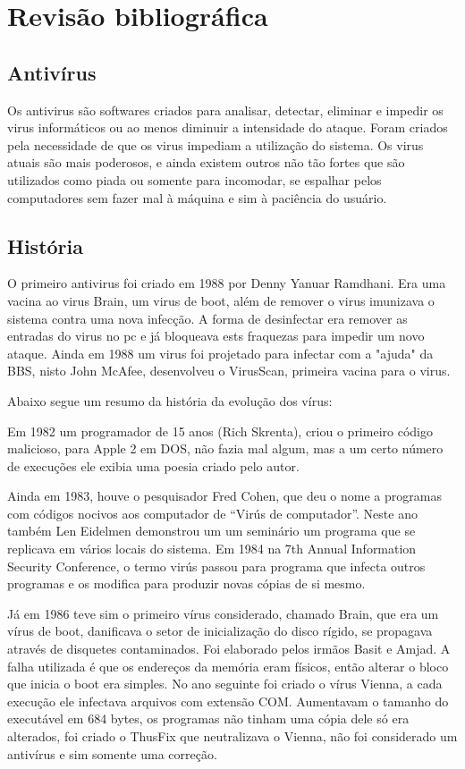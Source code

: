 
\chapter{Revisão bibliográfica}

\section{Antivírus}
Os antivirus \cite{Szor} são softwares criados para analisar, detectar, eliminar e impedir os virus informáticos ou ao menos diminuir a intensidade do ataque. Foram criados pela necessidade de que os virus impediam a utilização do sistema. Os virus atuais são mais poderosos, e ainda existem outros não tão fortes que são utilizados como piada ou somente para incomodar, se espalhar pelos computadores sem fazer mal à máquina e sim à paciência do usuário.

\section{História}
O primeiro antivirus foi criado em 1988 por Denny Yanuar Ramdhani. Era uma vacina ao virus Brain, um virus de boot, além de remover o virus imunizava o sistema contra uma nova infecção. A forma de desinfectar era remover as entradas do virus no pc e já bloqueava ests fraquezas para impedir um novo ataque. Ainda em 1988 um virus foi projetado para infectar com a "ajuda" da BBS, nisto John McAfee, desenvolveu o VirusScan, primeira vacina para o virus.

	Abaixo segue um resumo da história da evolução dos vírus:
	
	Em 1982 um programador de 15 anos (Rich Skrenta), criou o primeiro código malicioso, para Apple 2 em DOS, não fazia mal algum, mas a um certo número de execuções ele exibia uma poesia criado pelo autor.
	
	
	Ainda em 1983, houve o pesquisador Fred Cohen, que deu o nome a programas com códigos nocivos aos computador de “Virús de computador”. Neste ano também Len Eidelmen demonstrou um um seminário um programa que se replicava em vários locais do sistema. Em 1984 na 7th Annual Information Security Conference, o termo virús passou para programa que infecta outros programas e os modifica para produzir novas cópias de si mesmo. 
	
	
	Já em 1986 teve sim o primeiro vírus considerado, chamado Brain, que era um vírus de boot, danificava o setor de inicialização do disco rígido, se propagava através de disquetes contaminados. Foi elaborado pelos irmãos Basit e Amjad. A falha utilizada é que os endereços da memória eram físicos, então alterar o bloco que inicia o boot era simples. No ano seguinte foi criado o vírus Vienna, a cada execução ele infectava arquivos com extensão COM. Aumentavam o tamanho do executável em 684 bytes, os programas não tinham uma cópia dele só era alterados, foi criado o ThusFix que neutralizava o Vienna, não foi considerado um antivírus e sim somente uma correção.


